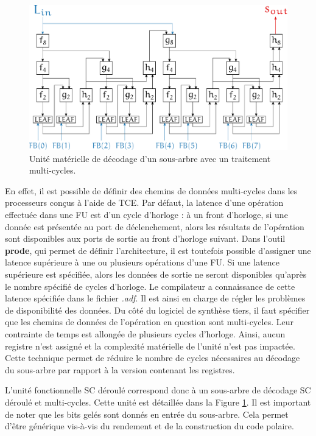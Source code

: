 \begin{figure}[htp]
	\centering
	\includegraphics[width=\textwidth]{main/ch4_fig/unrolled_multicycle}
	\caption{Unité matérielle de décodage d'un sous-arbre avec un traitement multi-cycles.}
	\label{fig:unrolled_multicycles}
\end{figure}

En effet, il est possible de définir des chemins de données multi-cycles dans les processeurs conçus à l'aide de TCE. Par défaut, la latence d'une opération effectuée dans une FU est d'un cycle d'horloge : à un front d'horloge, si une donnée est présentée au port de déclenchement, alors les résultats de l'opération sont disponibles aux ports de sortie au front d'horloge suivant. Dans l'outil \textbf{prode}, qui permet de définir l'architecture, il est toutefois possible d'assigner une latence supérieure à une ou plusieurs opérations d'une FU. Si une latence supérieure est spécifiée, alors les données de sortie ne seront disponibles qu'après le nombre spécifié de cycles d'horloge. Le compilateur a connaissance de cette latence spécifiée dans le fichier \textit{.adf}. Il est ainsi en charge de régler les problèmes de disponibilité des données. Du côté du logiciel de synthèse tiers, il faut spécifier que les chemins de données de l'opération en question sont multi-cycles. Leur contrainte de temps est allongée de plusieurs cycles d'horloge. Ainsi, aucun registre n'est assigné et la complexité matérielle de l'unité n'est pas impactée. Cette technique permet de réduire le nombre de cycles nécessaires au décodage du sous-arbre par rapport à la version contenant les registres.

L'unité fonctionnelle \og SC déroulé \fg correspond donc à un sous-arbre de décodage SC déroulé et multi-cycles. Cette unité est détaillée dans la Figure \ref{fig:unrolled_multicycles}. Il est important de noter que les bits gelés sont donnés en entrée du sous-arbre. Cela permet d'être générique vis-à-vis du rendement et de la construction du code polaire.


